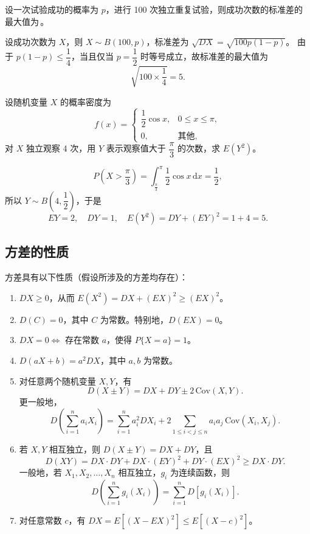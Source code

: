 \documentclass[lang=cn,11pt]{elegantbook}
\begin{document}
\begin{exercise}\label{exer:4-1-binomial}
设一次试验成功的概率为 \(p\)，进行 100 次独立重复试验，则成功次数的标准差的最大值为\,\underline{\hspace{2cm}}。
\end{exercise}
\begin{solution}
设成功次数为 \(X\)，则 \(X \sim B(100,p)\)，标准差为 \(\sqrt{DX} = \sqrt{100p(1-p)}\)。
由于 \(p(1-p) \leqslant \dfrac{1}{4}\)，当且仅当 \(p = \dfrac{1}{2}\) 时等号成立，故标准差的最大值为
\[
\sqrt{100 \times \frac{1}{4}} = 5.
\]
\end{solution}

\begin{exercise}\label{exer:4-2-cos}
设随机变量 \(X\) 的概率密度为
\[
f(x) = \begin{cases} \dfrac{1}{2}\cos x, & 0 \leqslant x \leqslant \pi, \\[4pt] 0, & \text{其他}, \end{cases}
\]
对 \(X\) 独立观察 4 次，用 \(Y\) 表示观察值大于 \(\dfrac{\pi}{3}\) 的次数，求 \(E(Y^2)\)。
\end{exercise}
\begin{solution}
\[
P\!\left(X > \frac{\pi}{3}\right) = \int_{\frac{\pi}{3}}^{\pi} \frac{1}{2}\cos x\,\mathrm{d}x = \frac{1}{2},
\]
所以 \(Y \sim B\!\left(4, \dfrac{1}{2}\right)\)，于是
\[
EY = 2,\quad DY = 1,\quad E(Y^2) = DY + (EY)^2 = 1 + 4 = 5.
\]
\end{solution}



\subsection{方差的性质}

\begin{property}\label{prop:variance}
方差具有以下性质（假设所涉及的方差均存在）：
\begin{enumerate}
    \item \(DX \geqslant 0\)，从而 \(E(X^2) = DX + (EX)^2 \geqslant (EX)^2\)。
    \item \(D(C) = 0\)，其中 \(C\) 为常数。特别地，\(D(EX) = 0\)。
    \item \(DX = 0 \Leftrightarrow\) 存在常数 \(a\)，使得 \(P\{X = a\} = 1\)。
    \item \(D(aX + b) = a^2 DX\)，其中 \(a, b\) 为常数。
    \item 对任意两个随机变量 \(X, Y\)，有
    \[
    D(X \pm Y) = DX + DY \pm 2\,\mathrm{Cov}(X,Y).
    \]
    更一般地，
    \[
    D\!\left(\sum_{i=1}^{n} a_i X_i\right) = \sum_{i=1}^{n} a_i^2 DX_i + 2\sum_{1 \leqslant i < j \leqslant n} a_i a_j\,\mathrm{Cov}(X_i,X_j).
    \]
    \item 若 \(X, Y\) 相互独立，则 \(D(X \pm Y) = DX + DY\)，且
    \[
    D(XY) = DX \cdot DY + DX \cdot (EY)^2 + DY \cdot (EX)^2 \geqslant DX \cdot DY.
    \]
    一般地，若 \(X_1, X_2, \dots, X_n\) 相互独立，\(g_i\) 为连续函数，则
    \[
    D\!\left(\sum_{i=1}^{n} g_i(X_i)\right) = \sum_{i=1}^{n} D[g_i(X_i)].
    \]
    \item 对任意常数 \(c\)，有 \(DX = E[(X - EX)^2] \leqslant E[(X - c)^2]\)。
\end{enumerate}
\end{property}
\end{document}
